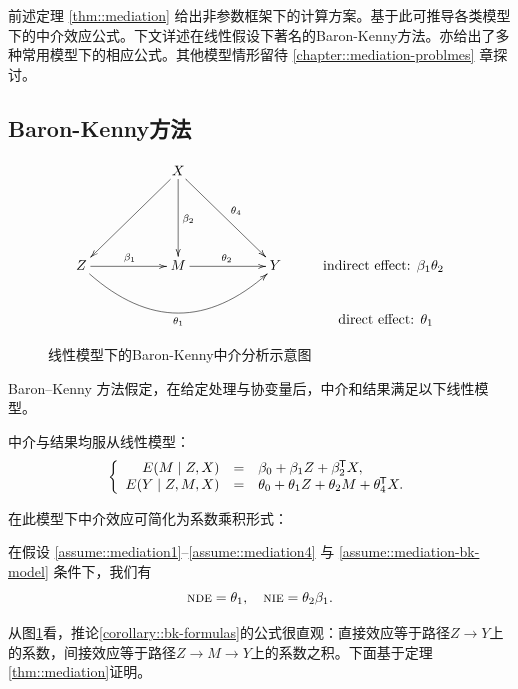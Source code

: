 前述定理 \ref{thm::mediation} 给出非参数框架下的计算方案。基于此可推导各类模型下的中介效应公式。下文详述在线性假设下著名的Baron-Kenny方法。\citet{vanderweele2015explanation}亦给出了多种常用模型下的相应公式。其他模型情形留待 \ref{chapter::mediation-problmes} 章探讨。 

\subsection{Baron-Kenny方法}


\begin{figure}[ht]
\centering
$$
\begin{xy}
\xymatrix{
&  & X \ar[ddll] \ar[dd]^{\beta_2} \ar[ddrr]^{\theta_4} \\
&&\\
Z \ar[rr]^{\beta_1} \ar@/_2.8pc/[rrrr]_{\theta_1} & & M\ar[rr]^{\theta_2} & & Y & \text{indirect effect: } \beta_1\theta_2 \\
&&&&& \text{  direct effect: } \theta_1 }
\end{xy}
$$
\caption{线性模型下的Baron-Kenny中介分析示意图}\label{fg::mediationDAG-BK}
\end{figure}

Baron--Kenny 方法假定，在给定处理与协变量后，中介和结果满足以下线性模型。

\begin{assumption}
\label{assume::mediation-bk-model}
中介与结果均服从线性模型：
$$
\left\{\begin{array}{rcl}
E(M \mid Z, X) &=&  \beta_0 + \beta_1 Z + \beta_2^{\mkern-1.5mu\mathsf{T}} X, \\
E(Y\mid Z,M,X) &=& \theta_0 + \theta_1 Z + \theta_2 M + \theta_4^{\mkern-1.5mu\mathsf{T}} X.
\end{array}\right.
$$
\end{assumption}


 
在此模型下中介效应可简化为系数乘积形式： 

\begin{corollary}
\label{corollary::bk-formulas}
在假设 \ref{assume::mediation1}--\ref{assume::mediation4} 与 \ref{assume::mediation-bk-model} 条件下，我们有 
$$
\textsc{nde} = \theta_1
,\quad 
\textsc{nie} = \theta_2 \beta_1 .
$$
\end{corollary}


从图\ref{fg::mediationDAG-BK}看，推论\ref{corollary::bk-formulas}的公式很直观：直接效应等于路径$Z\rightarrow Y$上的系数，间接效应等于路径$Z\rightarrow M\rightarrow Y$上的系数之积。下面基于定理\ref{thm::mediation}证明。 


